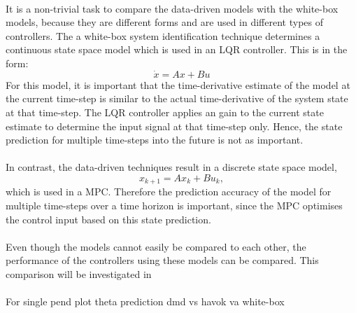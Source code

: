         \paragraph{}
        It is a non-trivial task to compare the data-driven models with the white-box models,
        because they are different forms and are used in different types of controllers.
        The a white-box system identification technique determines a continuous state space model 
        which is used in an LQR controller. 
        This is in the form:
        \begin{equation}
            \dot{x} = A x + B u
        \end{equation}
        For this model, it is important that the time-derivative estimate of the model 
        at the current time-step 
        is similar to the actual time-derivative of the system state at that time-step.
        The LQR controller applies an gain to the current state estimate 
        to determine the input signal at that time-step only.
        Hence, the state prediction for multiple time-steps into the future is not as important.

        \paragraph{}
        In contrast, the data-driven techniques result in a discrete state space model,
        \begin{equation}
            x_{k+1} = A x_k + B u_k ,
        \end{equation} 
        which is used in a MPC.
        Therefore the prediction accuracy of the model for multiple time-steps over a time horizon is important,
        since the MPC optimises the control input based on this state prediction.
        
        \paragraph{}
        Even though the models cannot easily be compared to each other, 
        the performance of the controllers using these models can be compared.
        This comparison will be investigated in %

        \paragraph{}
        For single pend
        plot theta prediction dmd vs havok va white-box

